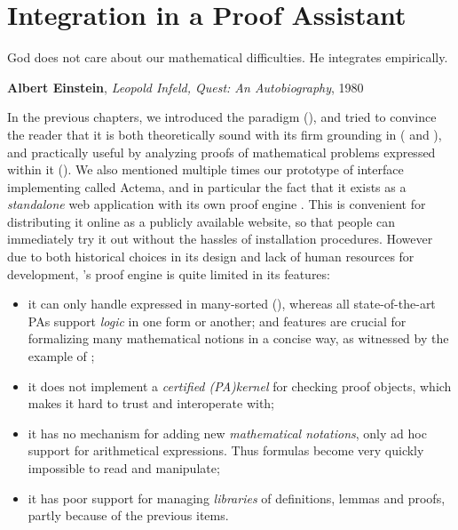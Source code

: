 \setchapterpreamble[u]{\margintoc}
\chapter{Integration in a Proof Assistant}

\epigraph{God does not care about our mathematical difficulties. He integrates
empirically.}{\textbf{Albert Einstein}, \textit{Leopold Infeld, Quest: An
Autobiography}, 1980}

In the previous chapters, we introduced the  paradigm
(), and tried to convince the reader that it is both theoretically
sound with its firm grounding in   ( and
), and practically useful by analyzing proofs of
mathematical problems expressed within it (). We also mentioned
multiple times our prototype of interface implementing  called
Actema, and in particular the fact that it exists as a \emph{standalone} web
application with its own proof engine . This is
convenient for distributing it online as a publicly available website, so that
people can immediately try it out without the hassles of installation
procedures. However due to both historical choices in its design and lack of
human resources for development, 's proof engine is quite limited in its
features:
\begin{itemize}
  \item it can only handle  expressed in many-sorted 
     (), whereas all state-of-the-art PAs support
    \emph{ logic} in one form or another; and  features
    are crucial for formalizing many mathematical notions in a concise way, as
    witnessed by the example of ;
  \item it does not implement a \emph{certified \kl(PA){kernel}} for checking
    proof objects, which makes it hard to trust and interoperate with;
  \item it has no mechanism for adding new \emph{mathematical notations}, only
    ad hoc support for arithmetical expressions. Thus formulas become very
    quickly impossible to read and manipulate;
  \item it has poor support for managing \emph{libraries} of definitions, lemmas
    and proofs, partly because of the previous items.
\end{itemize}

